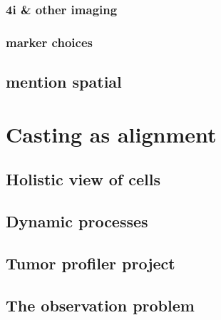 \subsubsection{4i \& other imaging}
\subsubsection{marker choices}
\subsection{mention spatial}

\section{Casting as alignment}
\subsection{Holistic view of cells}
\subsection{Dynamic processes}
\subsection{Tumor profiler project}
\subsection{The observation problem}
